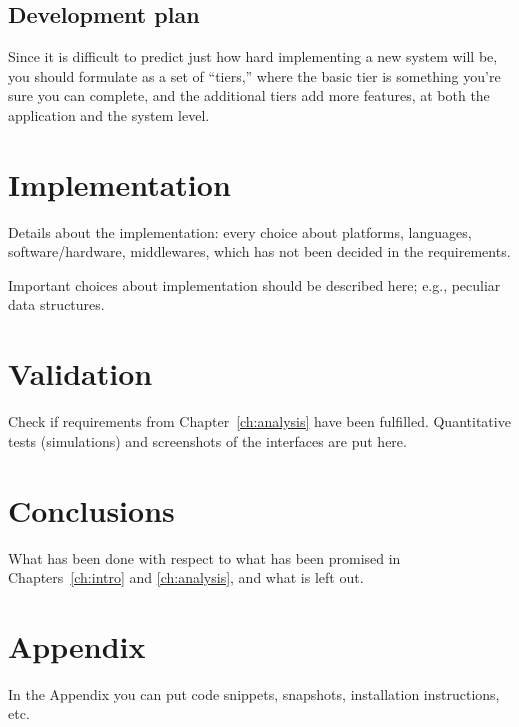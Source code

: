 \documentclass[a4paper, oneside]{memoir}
\begin{document}
\section{Development plan}
Since it is difficult to predict just how hard implementing a new system will be, you should formulate as a set of ``tiers,'' where the basic tier is something you’re sure you can complete, and the additional tiers add more features, at both the application and the system level.

\chapter{Implementation}

Details about the implementation: every choice about platforms, languages, software/hardware, middlewares, which has not been decided in the requirements.


Important choices about implementation should be described here; e.g., peculiar data structures.


\chapter{Validation}

Check if requirements from Chapter~\ref{ch:analysis} have been fulfilled.
Quantitative tests (simulations) and screenshots of the interfaces are put here.


\chapter{Conclusions}

What has been done with respect to what has been promised in Chapters~\ref{ch:intro} and \ref{ch:analysis}, and what is left out.

\appendix

\chapter{Appendix}

In the Appendix you can put code snippets, snapshots, installation instructions, etc.
\end{document}
